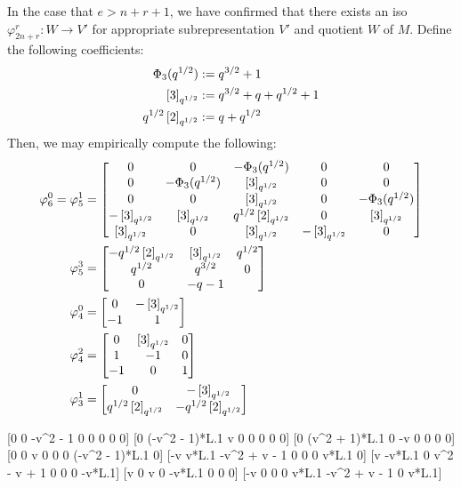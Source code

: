\documentclass{amsart}
\begin{document}
In the case that $e > n + r + 1$, we have confirmed that there exists an iso $\varphi_{2n + r}^r:W \rightarrow V'$ for appropriate subrepresentation $V'$ and quotient $W$ of $M$.
\def\tho{\Phi_3(q^{1/2})}
\def\tht{\brk{3}_{q^{1/2}}}
\def\to{q^{1/2}\brk{2}_{q^{1/2}}}
Define the following coefficients:
\begin{align*}
  \tho &:= q^{3/2} + 1\\
  \tht &:= q^{3/2} + q + q^{1/2} + 1\\
  \to &:= q + q^{1/2}
\end{align*}
Then, we may empirically compute the following:
\begin{align*}
  \varphi_6^0 = \varphi_5^1 &= \begin{bmatrix}
    0 & 0 & -\tho & 0 & 0\\
    0 & -\tho & \tht & 0 & 0\\
    0 & 0 & \tht & 0 & -\tho\\
    -\tht & \tht & \to & 0 & \tht\\
    \tht & 0 & \tht & -\tht & 0
  \end{bmatrix}\\
  \varphi_5^3 &= \begin{bmatrix}
    -\to & \tht & q^{1/2}\\
    q^{1/2} & q^{3/2} & 0\\
    0 & -q - 1
  \end{bmatrix}\\
  \varphi_4^0 &= \begin{bmatrix}
    0 & -\tht\\
    -1 & 1
  \end{bmatrix}\\
  \varphi_4^2 &= \begin{bmatrix}
    0 & \tht & 0\\
    1 & -1 & 0\\
    -1 & 0 & 1
  \end{bmatrix}\\
  \varphi_3^1 &= \begin{bmatrix}
    0 & -\tht\\
    \to & -\to
  \end{bmatrix}
\end{align*}
\iffalse
[0 0 v^3 - 1 0 0]
[0 (v^3 - 1)*L.1 -v^3 + v^2 - v + 1 0 0]
[0 0 -v^3 + v^2 - v + 1 0 (v^3 - 1)*L.1]
[v^3 - v^2 + v - 1 (-v^3 + v^2 - v + 1)*L.1 v^2 - v 0 (-v^3 + v^2 - v + 1)*L.1]
[-v^3 + v^2 - v + 1 0 -v^3 + v^2 - v + 1 (v^3 - v^2 + v - 1)*L.1 0]

[0 0 -v^2 - 1 0 0 0 0 0]
[0 (-v^2 - 1)*L.1 v 0 0 0 0 0]
[0 (v^2 + 1)*L.1 0 -v 0 0 0 0]
[0 0 v 0 0 0 (-v^2 - 1)*L.1 0]
[-v v*L.1 -v^2 + v - 1 0 0 0 v*L.1 0]
[v -v*L.1 0 v^2 - v + 1 0 0 0 -v*L.1]
[v 0 v 0 -v*L.1 0 0 0]
[-v 0 0 0 v*L.1 -v^2 + v - 1 0 v*L.1]
\end{document}
